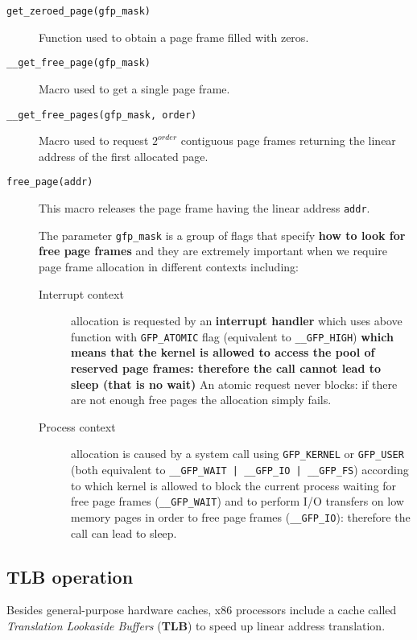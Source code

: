 \documentclass[10pt,a4paper]{article}
\begin{document}
\begin{description}
\item[\texttt{get\_zeroed\_page(gfp\_mask)}] Function used to obtain a page frame filled with zeros.
\item[\texttt{\_\_get\_free\_page(gfp\_mask)}] Macro used to get a single page frame.
\item[\texttt{\_\_get\_free\_pages(gfp\_mask, order)}] Macro used to request $2^{order}$ contiguous page frames returning the linear address of the
first allocated page.
\item[\texttt{free\_page(addr)}] This macro releases the page frame having the linear address \texttt{addr}.

The parameter \texttt{gfp\_mask} is a group of flags that specify \textbf{how to look for free page frames} and they are extremely important when we require page frame allocation in different contexts including: 
\begin{description}
\item[Interrupt context] allocation is requested by an \textbf{interrupt handler} which uses above function with \texttt{GFP\_ATOMIC} flag (equivalent to \texttt{\_\_GFP\_HIGH}) \textbf{which means that the kernel is allowed to access the pool of reserved page frames: therefore the call cannot lead to sleep (that is no wait)}  An atomic request never blocks: if there are not enough free pages the allocation simply fails.

\item[Process context] allocation is caused by a system call using \texttt{GFP\_KERNEL} or \texttt{GFP\_USER} (both equivalent to \texttt{\_\_GFP\_WAIT | \_\_GFP\_IO | \_\_GFP\_FS}) according to which kernel is allowed to block the current process waiting for free page frames (\texttt{\_\_GFP\_WAIT}) and to perform I/O transfers on low memory pages in order to free page frames (\texttt{\_\_GFP\_IO}): therefore the call can lead to sleep.
\end{description}

\end{description}



\subsection{TLB operation}

Besides general-purpose hardware caches, x86 processors include a cache called \textit{Translation Lookaside Buffers} (\textbf{TLB}) to speed up linear address translation.
\end{document}
